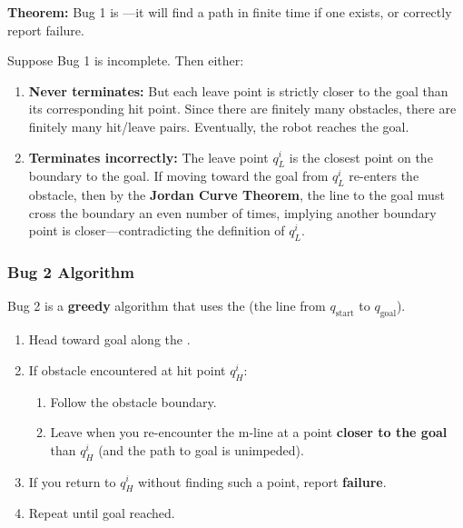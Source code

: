 \begin{thmbox}
\textbf{Theorem:} Bug 1 is ---it will find a path in finite time if one exists, or correctly report failure.
\end{thmbox}

\begin{exbox}
Suppose Bug 1 is incomplete. Then either:
\begin{enumerate}
  \item \textbf{Never terminates:} But each leave point is strictly closer to the goal than its corresponding hit point. Since there are finitely many obstacles, there are finitely many hit/leave pairs. Eventually, the robot reaches the goal.
  \item \textbf{Terminates incorrectly:} The leave point $q_L^i$ is the closest point on the boundary to the goal. If moving toward the goal from $q_L^i$ re-enters the obstacle, then by the \textbf{Jordan Curve Theorem}, the line to the goal must cross the boundary an even number of times, implying another boundary point is closer---contradicting the definition of $q_L^i$.
\end{enumerate}
\end{exbox}

\separator

\subsubsection{Bug 2 Algorithm}

Bug 2 is a \textbf{greedy} algorithm that uses the  (the line from $q_{\text{start}}$ to $q_{\text{goal}}$).

\begin{thmbox}
\begin{enumerate}
  \item Head toward goal along the .
  \item If obstacle encountered at hit point $q_H^i$:
  \begin{enumerate}
    \item Follow the obstacle boundary.
    \item Leave when you re-encounter the m-line at a point \textbf{closer to the goal} than $q_H^i$ (and the path to goal is unimpeded).
  \end{enumerate}
  \item If you return to $q_H^i$ without finding such a point, report \textbf{failure}.
  \item Repeat until goal reached.
\end{enumerate}
\end{thmbox}

